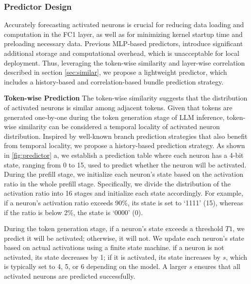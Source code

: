 \subsubsection{Predictor Design}\label{sec:predictor-design}

Accurately forecasting activated neurons is crucial for reducing data loading and computation in the FC1 layer, as well as for minimizing kernel startup time and preloading necessary data. 
Previous MLP-based predictors, introduce significant additional storage and computational overhead, which is unacceptable for local deployment. 
Thus, leveraging the token-wise similarity and layer-wise correlation described in section \ref{sec:similar}, we propose a lightweight predictor, which includes a history-based and correlation-based bundle prediction strategy.

\textbf{Token-wise Prediction} The token-wise similarity suggests that the distribution of activated neurons is similar among adjacent tokens. Given that tokens are generated one-by-one during the token generation stage of LLM inference, token-wise similarity can be considered a temporal locality of activated neuron distribution. Inspired by well-known branch prediction strategies that also benefit from temporal locality, we propose a history-based prediction strategy.
As shown in \fig \ref{fig:predictor} a, we establish a prediction table where each neuron has a 4-bit state, ranging from 0 to 15, used to predict whether the neuron will be activated. During the prefill stage, we initialize each neuron's state based on the activation ratio in the whole prefill stage. Specifically, we divide the distribution of the activation ratio into 16 stages and initialize each state accordingly. For example, if a neuron's activation ratio exceeds 90\%, its state is set to `1111' (15), whereas if the ratio is below 2\%, the state is `0000' (0).

During the token generation stage, if a neuron's state exceeds a threshold \( T1 \), we predict it will be activated; otherwise, it will not. 
We update each neuron's state based on actual activations using a finite state machine. 
if a neuron is not activated, its state decreases by 1; if it is activated, its state increases by \( s \), which is typically set to 4, 5, or 6 depending on the model. A larger \( s \) ensures that all activated neurons are predicted successfully.

